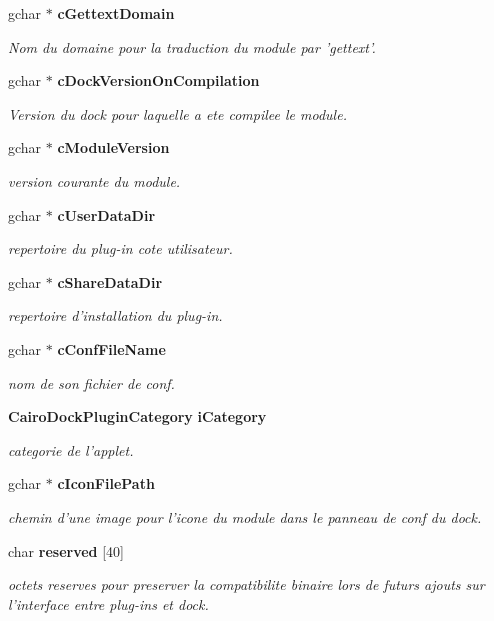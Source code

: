 \begin{CompactItemize}
gchar $\ast$ {\bf cGettextDomain}
\begin{CompactList}\small\item\em Nom du domaine pour la traduction du module par 'gettext'. \item\end{CompactList}\item 
gchar $\ast$ {\bf cDockVersionOnCompilation}
\begin{CompactList}\small\item\em Version du dock pour laquelle a ete compilee le module. \item\end{CompactList}\item 
gchar $\ast$ {\bf cModuleVersion}
\begin{CompactList}\small\item\em version courante du module. \item\end{CompactList}\item 
gchar $\ast$ {\bf cUserDataDir}
\begin{CompactList}\small\item\em repertoire du plug-in cote utilisateur. \item\end{CompactList}\item 
gchar $\ast$ {\bf cShareDataDir}
\begin{CompactList}\small\item\em repertoire d'installation du plug-in. \item\end{CompactList}\item 
gchar $\ast$ {\bf cConfFileName}
\begin{CompactList}\small\item\em nom de son fichier de conf. \item\end{CompactList}\item 
{\bf CairoDockPluginCategory} {\bf iCategory}
\begin{CompactList}\small\item\em categorie de l'applet. \item\end{CompactList}\item 
gchar $\ast$ {\bf cIconFilePath}
\begin{CompactList}\small\item\em chemin d'une image pour l'icone du module dans le panneau de conf du dock. \item\end{CompactList}\item 
char {\bf reserved} [40]
\begin{CompactList}\small\item\em octets reserves pour preserver la compatibilite binaire lors de futurs ajouts sur l'interface entre plug-ins et dock. \item\end{CompactList}\end{CompactItemize}


